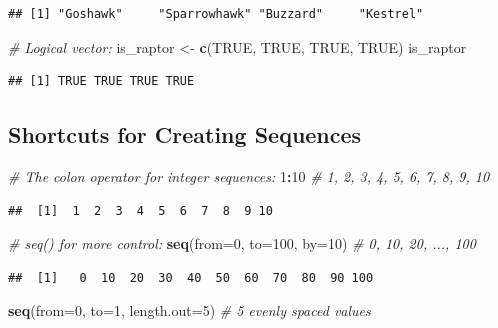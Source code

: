 \documentclass[
]{article}
\newenvironment{Shaded}{\begin{snugshade}}{\end{snugshade}}
\newcommand{\AttributeTok}[1]{\textcolor[rgb]{0.13,0.29,0.53}{#1}}
\newcommand{\CommentTok}[1]{\textcolor[rgb]{0.56,0.35,0.01}{\textit{#1}}}
\newcommand{\ConstantTok}[1]{\textcolor[rgb]{0.56,0.35,0.01}{#1}}
\newcommand{\DecValTok}[1]{\textcolor[rgb]{0.00,0.00,0.81}{#1}}
\newcommand{\FunctionTok}[1]{\textcolor[rgb]{0.13,0.29,0.53}{\textbf{#1}}}
\newcommand{\NormalTok}[1]{#1}
\newcommand{\OtherTok}[1]{\textcolor[rgb]{0.56,0.35,0.01}{#1}}
\newcommand{\SpecialCharTok}[1]{\textcolor[rgb]{0.81,0.36,0.00}{\textbf{#1}}}
\begin{document}
\begin{verbatim}
## [1] "Goshawk"     "Sparrowhawk" "Buzzard"     "Kestrel"
\end{verbatim}

\begin{Shaded}
\begin{Highlighting}[]
\CommentTok{\# Logical vector:}
\NormalTok{is\_raptor }\OtherTok{\textless{}{-}} \FunctionTok{c}\NormalTok{(}\ConstantTok{TRUE}\NormalTok{, }\ConstantTok{TRUE}\NormalTok{, }\ConstantTok{TRUE}\NormalTok{, }\ConstantTok{TRUE}\NormalTok{)}
\NormalTok{is\_raptor}
\end{Highlighting}
\end{Shaded}

\begin{verbatim}
## [1] TRUE TRUE TRUE TRUE
\end{verbatim}

\subsection{Shortcuts for Creating
Sequences}\label{shortcuts-for-creating-sequences}

\begin{Shaded}
\begin{Highlighting}[]
\CommentTok{\# The colon operator for integer sequences:}
\DecValTok{1}\SpecialCharTok{:}\DecValTok{10}              \CommentTok{\# 1, 2, 3, 4, 5, 6, 7, 8, 9, 10}
\end{Highlighting}
\end{Shaded}

\begin{verbatim}
##  [1]  1  2  3  4  5  6  7  8  9 10
\end{verbatim}

\begin{Shaded}
\begin{Highlighting}[]
\CommentTok{\# seq() for more control:}
\FunctionTok{seq}\NormalTok{(}\AttributeTok{from=}\DecValTok{0}\NormalTok{, }\AttributeTok{to=}\DecValTok{100}\NormalTok{, }\AttributeTok{by=}\DecValTok{10}\NormalTok{)      }\CommentTok{\# 0, 10, 20, ..., 100}
\end{Highlighting}
\end{Shaded}

\begin{verbatim}
##  [1]   0  10  20  30  40  50  60  70  80  90 100
\end{verbatim}

\begin{Shaded}
\begin{Highlighting}[]
\FunctionTok{seq}\NormalTok{(}\AttributeTok{from=}\DecValTok{0}\NormalTok{, }\AttributeTok{to=}\DecValTok{1}\NormalTok{, }\AttributeTok{length.out=}\DecValTok{5}\NormalTok{) }\CommentTok{\# 5 evenly spaced values}
\end{Highlighting}
\end{Shaded}
\end{document}
